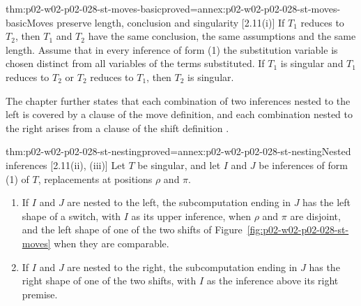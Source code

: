 \begin{hblemma}{thm:p02-w02-p02-028-st-moves-basic}{proved=annex:p02-w02-p02-028-st-moves-basic}{Moves preserve length, conclusion and singularity [2.11(i)]}
If \(T_1\) reduces to \(T_2\), then \(T_1\) and \(T_2\) have the same
conclusion, the same assumptions and the same length.  Assume that in every
inference of form (1) the substitution variable is chosen distinct from all
variables of the terms substituted.  If \(T_1\) is singular and \(T_1\)
reduces to \(T_2\) or \(T_2\) reduces to \(T_1\), then \(T_2\) is singular.
\end{hblemma}

The chapter further states that each combination of two inferences nested to
the left is covered by a clause of the move definition, and each combination
nested to the right arises from a clause of the shift definition
\cite[\S2.11(ii)--(iii), p.~903]{Statman1977}.

\begin{hblemma}{thm:p02-w02-p02-028-st-nesting}{proved=annex:p02-w02-p02-028-st-nesting}{Nested inferences [2.11(ii), (iii)]}
Let \(T\) be singular, and let \(I\) and \(J\) be inferences of form (1)
of \(T\), replacements at positions \(\rho\) and \(\pi\).
\begin{enumerate}
  \item[(ii)] If \(I\) and \(J\) are nested to the left, the subcomputation
        ending in \(J\) has the left shape of a switch, with \(I\) as its
        upper inference, when \(\rho\) and \(\pi\) are disjoint, and the left
        shape of one of the two shifts of
        Figure~\ref{fig:p02-w02-p02-028-st-moves} when they are comparable.
  \item[(iii)] If \(I\) and \(J\) are nested to the right, the subcomputation
        ending in \(J\) has the right shape of one of the two shifts, with
        \(I\) as the inference above its right premise.
\end{enumerate}
\end{hblemma}

